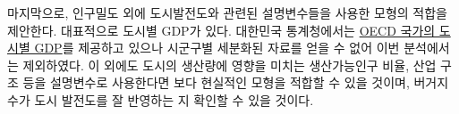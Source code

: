 \documentclass{scrartcl}
\begin{document}
마지막으로, 인구밀도 외에 도시발전도와 관련된 설명변수들을 사용한 모형의 적합을 제안한다. 대표적으로 도시별 GDP가 있다. 대한민국 통계청에서는 \href{http://kosis.kr/statHtml/statHtml.do?orgId=101&tblId=DT\_2KAA912\_OECD}{OECD 국가의 도시별 GDP}를 제공하고 있으나 시군구별 세분화된 자료를 얻을 수 없어 이번 분석에서는 제외하였다. 이 외에도 도시의 생산량에 영향을 미치는 생산가능인구 비율, 산업 구조 등을 설명변수로 사용한다면 보다 현실적인 모형을 적합할 수 있을 것이며, 버거지수가 도시 발전도를 잘 반영하는 지 확인할 수 있을 것이다.

\nocite{hoff2009first}
\nocite{lim8}
\nocite{gelman2013bayesian}

\end{document}
